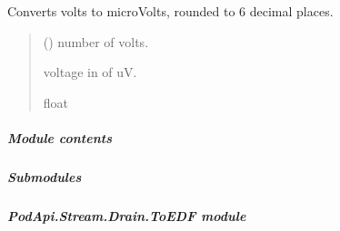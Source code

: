\documentclass[letterpaper,10pt,english]{sphinxmanual}
\begin{document}
\begin{fulllineitems}
\begin{fulllineitems}
\label{\detokenize{PodApi.Stream.Drain.PodHandler:PodApi.Stream.Drain.PodHandler.HandlerInterface.DrainDeviceHandler._uV}}
\pysigstartsignatures
{}
\pysigstopsignatures
\sphinxAtStartPar
Converts volts to microVolts, rounded to 6 decimal places.
\begin{quote}\begin{description}
\sphinxAtStartPar
{} (\sphinxstyleliteralemphasis{\sphinxupquote{ | }}) \textendash{} number of volts.

\sphinxAtStartPar
voltage in of uV.

\sphinxAtStartPar
float

\end{description}\end{quote}

\end{fulllineitems}


\end{fulllineitems}



\subparagraph{Module contents}
\label{\detokenize{PodApi.Stream.Drain.PodHandler:module-PodApi.Stream.Drain.PodHandler}}\label{\detokenize{PodApi.Stream.Drain.PodHandler:module-contents}}

\subparagraph{Submodules}
\label{\detokenize{PodApi.Stream.Drain:submodules}}

\subparagraph{PodApi.Stream.Drain.ToEDF module}
\label{\detokenize{PodApi.Stream.Drain:module-PodApi.Stream.Drain.ToEDF}}\label{\detokenize{PodApi.Stream.Drain:podapi-stream-drain-toedf-module}}
\end{document}
